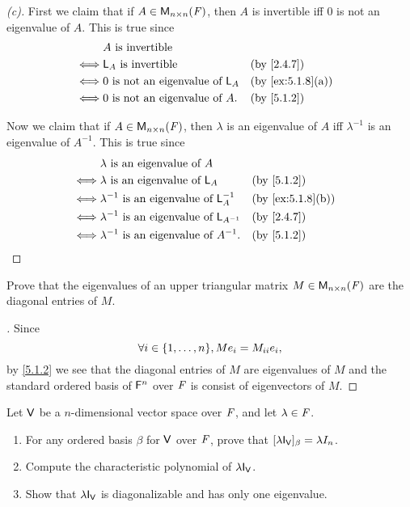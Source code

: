 \begin{proof}[(c)]
	First we claim that if \(A \in \ms[n][n][\F]\), then \(A\) is invertible iff \(0\) is not an eigenvalue of \(A\).
	This is true since
	\begin{align*}
		     & A \text{ is invertible}                                       \\
		\iff & \L_A \text{ is invertible}              &  & \by{2.4.7}       \\
		\iff & 0 \text{ is not an eigenvalue of } \L_A &  & \by{ex:5.1.8}[a] \\
		\iff & 0 \text{ is not an eigenvalue of } A.   &  & \by{5.1.2}
	\end{align*}

	Now we claim that if \(A \in \ms[n][n][\F]\), then \(\lambda\) is an eigenvalue of \(A\) iff \(\lambda^{-1}\) is an eigenvalue of \(A^{-1}\).
	This is true since
	\begin{align*}
		     & \lambda \text{ is an eigenvalue of } A                                      \\
		\iff & \lambda \text{ is an eigenvalue of } \L_A             &  & \by{5.1.2}       \\
		\iff & \lambda^{-1} \text{ is an eigenvalue of } \L_A^{-1}   &  & \by{ex:5.1.8}[b] \\
		\iff & \lambda^{-1} \text{ is an eigenvalue of } \L_{A^{-1}} &  & \by{2.4.7}       \\
		\iff & \lambda^{-1} \text{ is an eigenvalue of } A^{-1}.     &  & \by{5.1.2}
	\end{align*}
\end{proof}

\begin{ex}\label{ex:5.1.9}
	Prove that the eigenvalues of an upper triangular matrix \(M \in \ms[n][n][\F]\) are the diagonal entries of \(M\).
\end{ex}

\begin{proof}[]
	Since
	\[
		\forall i \in \set{1, \dots, n}, M e_i = M_{i i} e_i,
	\]
	by \cref{5.1.2} we see that the diagonal entries of \(M\) are eigenvalues of \(M\) and the standard ordered basis of \(\mathsf{F}^n\) over \(\mathit{F}\) is consist of eigenvectors of \(M\).
\end{proof}

\begin{ex}\label{ex:5.1.10}
	Let \(\mathsf{V}\) be a \(n\)-dimensional vector space over \(\mathit{F}\), and let \(\lambda \in \mathit{F}\).
	\begin{enumerate}
		\item For any ordered basis \(\beta\) for \(\mathsf{V}\) over \(\mathit{F}\), prove that \([\lambda \IT[\V]]_{\beta} = \lambda I_n\).
		\item Compute the characteristic polynomial of \(\lambda \IT[\V]\).
		\item Show that \(\lambda \IT[\V]\) is diagonalizable and has only one eigenvalue.
	\end{enumerate}
\end{ex}

